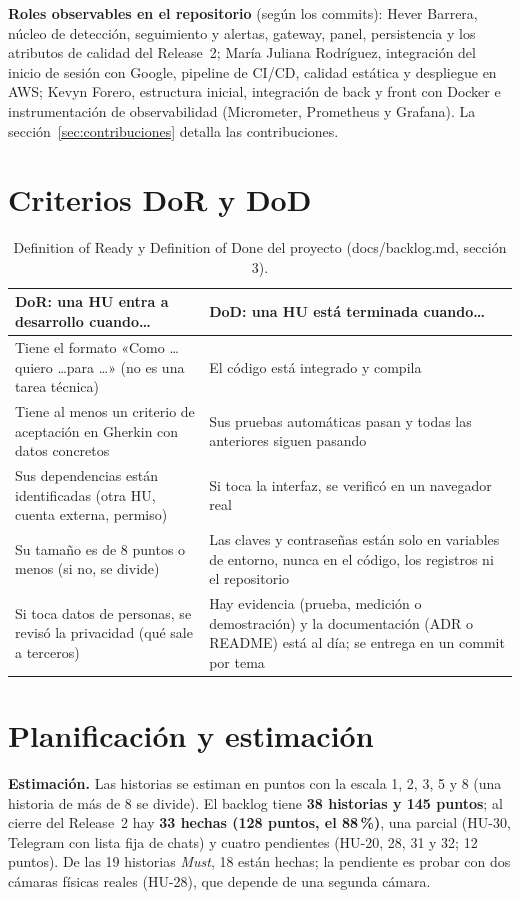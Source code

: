 \textbf{Roles observables en el repositorio} (según los commits): Hever Barrera, núcleo de detección, seguimiento y alertas, gateway,
panel, persistencia y los atributos de calidad del Release~2; María Juliana Rodríguez, integración del inicio de sesión con Google,
pipeline de CI/CD, calidad estática y despliegue en AWS; Kevyn Forero, estructura inicial, integración de back y front con Docker e
instrumentación de observabilidad (Micrometer, Prometheus y Grafana). La sección~\ref{sec:contribuciones} detalla las contribuciones.

\section{Criterios DoR y DoD}
\begin{table}[H]
\centering\small
\caption{Definition of Ready y Definition of Done del proyecto (docs/backlog.md, sección 3).}\label{tab:dordod}
\begin{tabularx}{\textwidth}{YY}
\toprule
\textbf{DoR: una HU entra a desarrollo cuando\ldots} & \textbf{DoD: una HU está terminada cuando\ldots} \\
\midrule
Tiene el formato «Como \ldots quiero \ldots para \ldots» (no es una tarea técnica) &
El código está integrado y compila \\
Tiene al menos un criterio de aceptación en Gherkin con datos concretos &
Sus pruebas automáticas pasan y todas las anteriores siguen pasando \\
Sus dependencias están identificadas (otra HU, cuenta externa, permiso) &
Si toca la interfaz, se verificó en un navegador real \\
Su tamaño es de 8 puntos o menos (si no, se divide) &
Las claves y contraseñas están solo en variables de entorno, nunca en el código, los registros ni el repositorio \\
Si toca datos de personas, se revisó la privacidad (qué sale a terceros) &
Hay evidencia (prueba, medición o demostración) y la documentación (ADR o README) está al día; se entrega en un commit por tema \\
\bottomrule
\end{tabularx}
\end{table}

\section{Planificación y estimación}
\textbf{Estimación.} Las historias se estiman en puntos con la escala 1, 2, 3, 5 y 8 (una historia de más de 8 se divide). El backlog
tiene \textbf{38 historias y 145 puntos}; al cierre del Release~2 hay \textbf{33 hechas (128 puntos, el 88\,\%)}, una parcial (HU-30,
Telegram con lista fija de chats) y cuatro pendientes (HU-20, 28, 31 y 32; 12 puntos). De las 19 historias \emph{Must}, 18 están hechas;
la pendiente es probar con dos cámaras físicas reales (HU-28), que depende de una segunda cámara.

